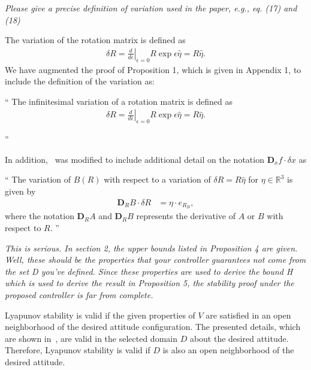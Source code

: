 \documentclass[11pt]{article}
\newcommand{\diff}[2]{\ensuremath{\frac{d #1}{d #2}}}
\newcommand{\dirDiff}[2]{\ensuremath{\mathbf{D}_{#2} #1 \cdot \delta #2}} %
\newcommand{\R}{\ensuremath{\mathbb{R}}}
\newcommand{\D}{\ensuremath{\mathbf{D}}}
\newenvironment{correction}{\begin{list}{}{\setlength{\leftmargin}{1cm}\setlength{\rightmargin}{1cm}}\vspace{\parsep}\item[]``}{''\end{list}}
\begin{document}
\begin{enumerate}
\item \textit{Please give a precise definition of variation used in the paper, e.g., eq. (17) and (18)}

The variation of the rotation matrix is defined as
\begin{align*}
    \delta R = \left. \diff{}{\epsilon} \right|_{\epsilon=0} R \exp{\epsilon \hat{\eta}} = R \hat{\eta} .
\end{align*}
We have augmented the proof of Proposition 1, which is given in Appendix 1, to include the definition of the variation as:
\begin{correction}
The infinitesimal variation of a rotation matrix is defined as
\begin{align*}
    \delta R = \left. \diff{}{\epsilon} \right|_{\epsilon=0} R \exp{\epsilon \hat{\eta}} = R \hat{\eta} .
\end{align*}

\end{correction}

In addition,~ was modified to include additional detail on the notation \( \dirDiff{f}{x}\) as
\begin{correction}
    The variation of \( B(R) \) with respect to a variation of \( \delta R = R \hat{\eta} \) for \( \eta \in \R^3 \) is given by
    \begin{align*}
        \dirDiff{B}{R} &= \eta \cdot e_{R_{B}} ,
    \end{align*}
  where the notation \( \D_R A \) and \(\D_R B\) represents the derivative of \( A \) or \( B \) with respect to \( R\).
\end{correction}

\item \textit{This is serious. In section 2, the upper bounds listed in Proposition 4 are given. Well, these should be the properties that your controller guarantees not come from the set D you've defined. Since these properties are used to derive the bound H which is used to derive the result in Proposition 5, the stability proof under the proposed controller is far from complete.}

Lyapunov stability is valid if the given properties of \( V \) are satisfied in an open neighborhood of the desired attitude configuration. 
The presented details, which are shown in~, are valid in the selected domain \( D \) about the desired attitude.
Therefore, Lyapunov stability is valid if \( D \) is also an open neighborhood of the desired attitude.


\end{enumerate}
\end{document}
